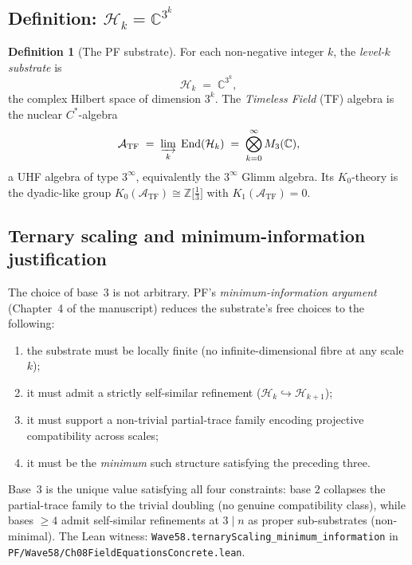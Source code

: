 \documentclass[11pt,a4paper]{article}
\theoremstyle{definition}
\newtheorem{definition}[theorem]{Definition}
\theoremstyle{remark}
\newcommand{\complexes}{\mathbb{C}}
\newcommand{\integers}{\mathbb{Z}}
\newcommand{\HilbertK}{\mathcal{H}_{k}}
\newcommand{\TF}{\mathcal{A}_{\mathrm{TF}}}
\newcommand{\lean}[1]{\texttt{\small #1}}
\begin{document}
\subsection{Definition: $\HilbertK = \complexes^{3^{k}}$}

\begin{definition}[The PF substrate]\label{def:substrate}
For each non-negative integer $k$, the \emph{level-$k$ substrate}
is
\[
  \HilbertK \;=\; \complexes^{3^{k}},
\]
the complex Hilbert space of dimension $3^{k}$. The
\emph{Timeless Field} (TF) algebra is the nuclear $C^{*}$-algebra
\[
  \TF \;=\; \varinjlim_{k}\; \mathrm{End}(\HilbertK)
  \;=\; \bigotimes_{k=0}^{\infty} M_{3}(\complexes),
\]
a UHF algebra of type $3^{\infty}$, equivalently the
$3^{\infty}$ Glimm algebra. Its $K_{0}$-theory is the dyadic-like
group
\(
  K_{0}(\TF) \cong \integers\bigl[\tfrac{1}{3}\bigr]
\)
with $K_{1}(\TF) = 0$.
\end{definition}

\subsection{Ternary scaling and minimum-information justification}

The choice of base~$3$ is not arbitrary. PF's
\emph{minimum-information argument} (Chapter~4 of the manuscript)
reduces the substrate's free choices to the following:

\begin{enumerate}
\item the substrate must be locally finite (no infinite-dimensional
fibre at any scale~$k$);
\item it must admit a strictly self-similar refinement
($\HilbertK \hookrightarrow \mathcal{H}_{k+1}$);
\item it must support a non-trivial partial-trace family
encoding projective compatibility across scales;
\item it must be the \emph{minimum} such structure satisfying the
preceding three.
\end{enumerate}

Base~$3$ is the unique value satisfying all four constraints: base
$2$ collapses the partial-trace family to the trivial doubling
(no genuine compatibility class), while bases $\ge 4$ admit
self-similar refinements at $3 \mid n$ as proper sub-substrates
(non-minimal). The Lean witness:
\lean{Wave58.ternaryScaling\_minimum\_information} in
\lean{PF/Wave58/Ch08FieldEquationsConcrete.lean}.
\end{document}
